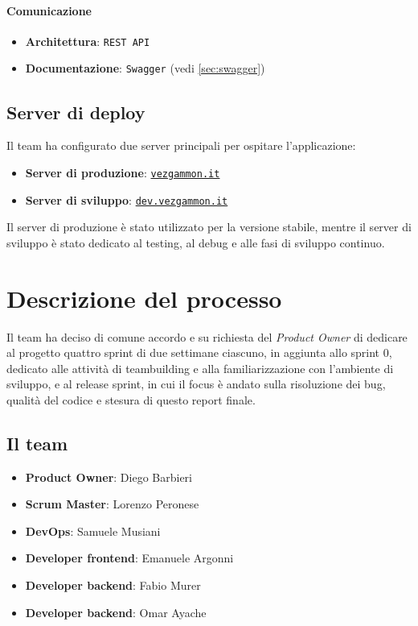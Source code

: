 \documentclass{article}
\begin{document}
\paragraph{Comunicazione}
\begin{itemize}
    \item \textbf{Architettura}: \texttt{REST API}
    \item \textbf{Documentazione}: \texttt{Swagger} (vedi \ref{sec:swagger})
\end{itemize}

\subsection{Server di deploy}

Il team ha configurato due server principali per ospitare l'applicazione:
\begin{itemize}
    \item \textbf{Server di produzione}: \href{https://vezgammon.it}{\texttt{vezgammon.it}}
    \item \textbf{Server di sviluppo}: \href{https://dev.vezgammon.it}{\texttt{dev.vezgammon.it}}
\end{itemize}
Il server di produzione è stato utilizzato per la versione stabile, mentre il server di sviluppo è stato dedicato al testing, 
al debug e alle fasi di sviluppo continuo.

\section{Descrizione del processo}

Il team ha deciso di comune accordo e su richiesta del \textit{Product Owner} di dedicare al progetto quattro sprint di due settimane 
ciascuno, in aggiunta allo sprint 0, dedicato alle attività di teambuilding e alla familiarizzazione con l'ambiente di sviluppo, e 
al release sprint, in cui il focus è andato sulla risoluzione dei bug, qualità del codice e stesura di questo report finale.

\subsection{Il team}

\begin{itemize}
    \item \textbf{Product Owner}: Diego Barbieri
    \item \textbf{Scrum Master}: Lorenzo Peronese
    \item \textbf{DevOps}: Samuele Musiani
    \item \textbf{Developer frontend}: Emanuele Argonni
    \item \textbf{Developer backend}: Fabio Murer
    \item \textbf{Developer backend}: Omar Ayache
\end{itemize}
\end{document}
